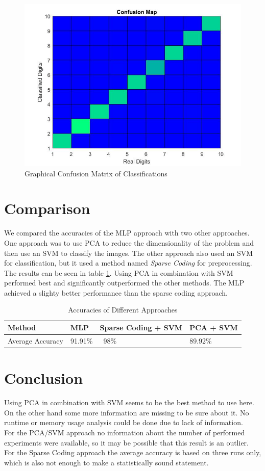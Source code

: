 \documentclass[paper=a4, fontsize=11pt]{scrartcl} %
\numberwithin{equation}{section} %
\numberwithin{figure}{section} %
\numberwithin{table}{section} %
\begin{document}
\begin{figure}[H]
	\centering
	\includegraphics[width = 0.6\linewidth]{./confusion.jpg}
	\caption{Graphical Confusion Matrix of Classifications}
	\label{fig:confusion}
\end{figure}

\section{Comparison}
We compared the accuracies of the MLP approach with two other approaches. One approach was to use PCA to reduce the dimensionality of the problem and then use an SVM to classify the images. The other approach also used an SVM for classification, but it used a method named \textit{Sparse Coding} for preprocessing.\\
The results can be seen in table \ref{tab:comparison}.
Using PCA in combination with SVM performed best and significantly outperformed the other methods.
The MLP achieved a slighty better performance than the sparse coding approach.


\begin{table}[H]
\centering
\caption{Accuracies of Different Approaches}
\label{tab:comparison}
\begin{tabular}{l|lll}
Method & MLP & Sparse Coding + SVM & PCA + SVM \\ \hline
Average Accuracy & 91.91\% & ~98\% & 89.92\%
\end{tabular}
\end{table}

\section{Conclusion}
Using PCA in combination with SVM seems to be the best method to use here. On the other hand some more information are missing to be sure about it. No runtime or memory usage analysis could be done due to lack of information.\\
For the PCA/SVM approach no information about the number of performed experiments were available, so it may be possible that this result is an outlier. For the Sparse Coding approach the average accuracy is based on three runs only, which is also not enough to make a statistically sound statement.
\end{document}
